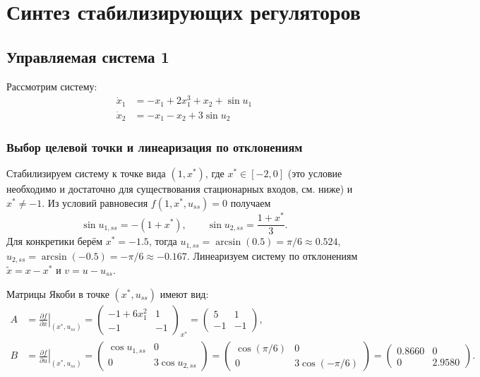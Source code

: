 \section*{Синтез стабилизирующих регуляторов}

\subsection*{Управляемая система 1}

Рассмотрим систему:
\begin{align}
\dot{x}_1 &= -x_1 + 2x_1^3 + x_2 + \sin u_1 \\
\dot{x}_2 &= -x_1 - x_2 + 3\sin u_2
\end{align}

\subsubsection*{Выбор целевой точки и линеаризация по отклонениям}

Стабилизируем систему к точке вида $(1,x^*)$, где $x^*\in[-2,0]$ (это условие необходимо и достаточно для существования стационарных входов, см. ниже) и $x^*\neq -1$.
Из условий равновесия $f(1,x^*,u_{ss})=0$ получаем
\[
\sin u_{1,ss} = -(1+x^*),\qquad \sin u_{2,ss} = \frac{1+x^*}{3}.
\]
Для конкретики берём $x^*=-1.5$, тогда $u_{1,ss}=\arcsin(0.5)=\pi/6\approx0.524$, $u_{2,ss}=\arcsin(-0.5)= -\pi/6\approx-0.167$.
Линеаризуем систему по отклонениям $\tilde x = x - x^*$ и $v = u - u_{ss}$.

Матрицы Якоби в точке $(x^*,u_{ss})$ имеют вид:
\begin{align*}
A &= \left.\frac{\partial f}{\partial x}\right|_{(x^*,u_{ss})} =
\begin{pmatrix}
-1 + 6x_1^2 & 1 \\
-1 & -1
\end{pmatrix}_{x^*} =
\begin{pmatrix}
5 & 1 \\
-1 & -1
\end{pmatrix}, \\
B &= \left.\frac{\partial f}{\partial u}\right|_{(x^*,u_{ss})} =
\begin{pmatrix}
\cos u_{1,ss} & 0 \\
0 & 3\cos u_{2,ss}
\end{pmatrix} =
\begin{pmatrix}
\cos(\pi/6) & 0 \\
0 & 3\cos(-\pi/6)
\end{pmatrix} =
\begin{pmatrix}
0.8660 & 0 \\
0 & 2.9580
\end{pmatrix}.
\end{align*}

